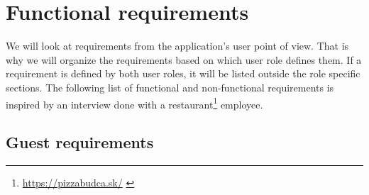 \section{Functional requirements}
We will look at requirements from the application's user point of view.
That is why we will organize the requirements based on which user role defines them.
If a requirement is defined by both user roles, it will be listed outside the role specific sections.
The following list of functional and non-functional requirements is inspired by an interview done with a restaurant\footnote{\url{https://pizzabudca.sk/}  \label{fnlabel}} employee.

\subsection{Guest requirements}
